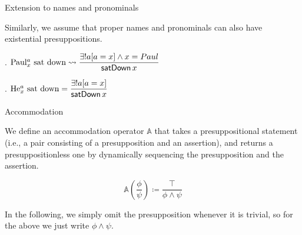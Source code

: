 \documentclass{beamer}
\begin{document}
\begin{frame}{Extension to names and pronominals}

  Similarly, we assume that proper names and pronominals can also have existential presuppositions.

  \ex. $\text{Paul$^{a}_{x}$ sat down} \rightsquigarrow \displaystyle\frac{\exists ! a[a = x] \wedge x = Paul}{\textsf{satDown}\,x}$

  \ex. $\text{He$^{a}_{x}$ sat down} = \displaystyle\frac{\exists ! a[a = x]}{\textsf{satDown}\,x}$

\end{frame}

\begin{frame}{Accommodation}

  We define an accommodation operator \(\mathbb{A}\) that takes a presuppositional statement (i.e., a pair consisting of a presupposition and an assertion), and returns a presuppositionless one by dynamically sequencing the presupposition and the assertion.

  \[\mathbb{A}\left(\frac{\phi}{\psi}\right) \coloneq \displaystyle\frac{\top}{\phi \wedge \psi}\]

  In the following, we simply omit the presupposition whenever it is trivial, so for the above we just write \(\phi \wedge \psi\).

\end{frame}
\end{document}
